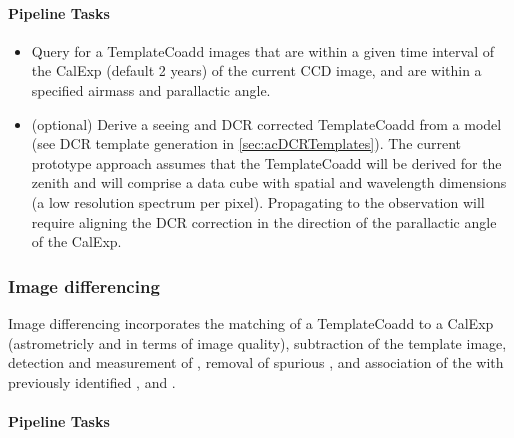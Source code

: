 \paragraph{Pipeline Tasks}

\begin{itemize}
\item Query for a TemplateCoadd images that are within a given time interval of the CalExp  (default 2 years) of the current CCD image, and are within a specified airmass and parallactic angle.
\item (optional) Derive a seeing and DCR corrected TemplateCoadd from a model (see DCR template generation in \ref{sec:acDCRTemplates}). The current prototype approach assumes that the TemplateCoadd  will be derived for the zenith and will comprise a data cube with spatial and wavelength dimensions (a low resolution spectrum per pixel). Propagating to the observation will require aligning the DCR correction in the direction of the parallactic angle of the CalExp.
\end{itemize}

\subsubsection{Image differencing}

Image differencing incorporates the matching of a TemplateCoadd to a CalExp (astrometricly and in terms of image quality), subtraction of the template image, detection and measurement of \DIASources, removal of spurious \DIASources, and association of the \DIASources with previously identified \DIAObjects, and \SSObjects.

\paragraph{Pipeline Tasks}

